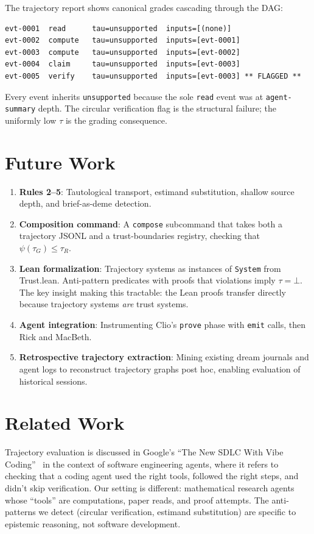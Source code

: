 \documentclass[11pt,a4paper]{article}
\theoremstyle{definition}
\theoremstyle{plain}
\theoremstyle{remark}
\begin{document}
The trajectory report shows canonical grades cascading through the DAG:

\begin{lstlisting}
evt-0001  read      tau=unsupported  inputs=[(none)]
evt-0002  compute   tau=unsupported  inputs=[evt-0001]
evt-0003  compute   tau=unsupported  inputs=[evt-0002]
evt-0004  claim     tau=unsupported  inputs=[evt-0003]
evt-0005  verify    tau=unsupported  inputs=[evt-0003] ** FLAGGED **
\end{lstlisting}

Every event inherits \texttt{unsupported} because the sole \texttt{read} event was at \texttt{agent-summary} depth. The circular verification flag is the structural failure; the uniformly low $\tau$ is the grading consequence.

\section{Future Work}

\begin{enumerate}
\item \textbf{Rules 2--5}: Tautological transport, estimand substitution, shallow source depth, and brief-as-deme detection.
\item \textbf{Composition command}: A \texttt{compose} subcommand that takes both a trajectory JSONL and a trust-boundaries registry, checking that $\psi(\tau_G) \leq \tau_R$.
\item \textbf{Lean formalization}: Trajectory systems as instances of \texttt{System} from Trust.lean. Anti-pattern predicates with proofs that violations imply $\tau = \bot$. The key insight making this tractable: the Lean proofs transfer directly because trajectory systems \emph{are} trust systems.
\item \textbf{Agent integration}: Instrumenting Clio's \texttt{prove} phase with \texttt{emit} calls, then Rick and MacBeth.
\item \textbf{Retrospective trajectory extraction}: Mining existing dream journals and agent logs to reconstruct trajectory graphs post hoc, enabling evaluation of historical sessions.
\end{enumerate}

\section{Related Work}

Trajectory evaluation is discussed in Google's ``The New SDLC With Vibe Coding''~\cite{google-sdlc} in the context of software engineering agents, where it refers to checking that a coding agent used the right tools, followed the right steps, and didn't skip verification. Our setting is different: mathematical research agents whose ``tools'' are computations, paper reads, and proof attempts. The anti-patterns we detect (circular verification, estimand substitution) are specific to epistemic reasoning, not software development.
\end{document}
